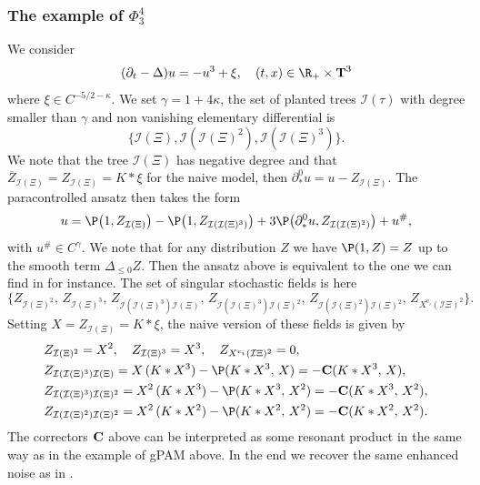 \documentclass[11pt]{preprint}
\newcommand{\mcI}{\mathcal{I}}
\newcommand{\T}{\mathbf{T}}
\newcommand{\bfC}{{\bf C}}
\begin{document}
	 
	 
	\subsubsection{The example of $\Phi_3^4$}
	
	We consider 
	\begin{equation}
	(\partial_t-\Delta) u = -u^3 + \xi, \quad (t,x) \in \R_+ \times \T^3
\end{equation}
	where $\xi\in C^{-5/2-\kappa}$. We set $\gamma = 1+4\kappa$, the set of planted trees $\mcI(\tau)$ with degree smaller than $\gamma$ and non vanishing elementary differential is $$\{\mcI(\Xi), \mcI(\mcI(\Xi)^2) , \mcI(\mcI(\Xi)^3)  \}.$$ We note that the tree $\mcI(\Xi)$ has negative degree and that $\overline{Z}_{\mcI(\Xi)} = Z_{\mcI(\Xi)}=K*\xi$ for the naive model, then $\partial^0_*u = u - Z_{\mcI(\Xi)}$. The paracontrolled ansatz then takes the form
	$$
	u= \P\big( 1, Z_{\mcI(\Xi)}  \big) -  \P\big(1 ,Z_{\mcI(\mcI(\Xi)^3)} \big) + 3\P\big(\partial^0_*u , Z_{\mcI(\mcI(\Xi)^2)}\big)  + u^\#,
	$$
	with $u^\#\in C^\gamma$.
We note that for any distribution $Z$ we have $\P(1,Z)=Z $ up to the smooth term $\Delta_{\leq0}Z$. Then the ansatz above  is equivalent to the one we can find in \cite{Phi43Paracontrol} for instance.
	The set of singular stochastic fields is here 
	$$
	\{ Z_{\mcI(\Xi)^2},\, Z_{\mcI(\Xi)^3}, \, Z_{\mcI( \mcI(\Xi)^3 )\mcI(\Xi)} , \, Z_{\mcI( \mcI(\Xi)^3 )\mcI(\Xi)^2}, \, Z_{\mcI( \mcI(\Xi)^2 )\mcI(\Xi)^2}, \, Z_{X^{e_i}(\mcI\Xi)^2 }  \}.
	$$
	Setting $X=Z_{\mcI(\Xi)}=K*\xi$, the naive version of these fields is given by 
	\begin{align*}
		&Z_{\mcI(\Xi)^2}= X^2, \quad  Z_{\mcI(\Xi)^3} = X^3, \quad Z_{X^{e_i}(\mcI\Xi)^2 }=0, 
		\\
		& Z_{\mcI( \mcI(\Xi)^3 )\mcI(\Xi)} = X \, (K*X^3) - \P(K*X^3,\, X) =-\bfC(K*X^3,\, X), 
		\\
		&Z_{\mcI( \mcI(\Xi)^3 )\mcI(\Xi)^2} = X^2 \, (K*X^3) - \P(K*X^3,\, X^2)=-\bfC(K*X^3,\, X^2),
		\\
		& Z_{\mcI( \mcI(\Xi)^2 )\mcI(\Xi)^2} = X^2 \, (K*X^2)  - \P(K*X^2,\, X^2)=-\bfC(K*X^2,\, X^2).
			\end{align*}
	The correctors $\bfC$ above can be interpreted as some resonant product in the same way as in the example of gPAM above. In the end we recover the same enhanced noise as in \cite{Phi43Paracontrol}.
	
	
\end{document}
